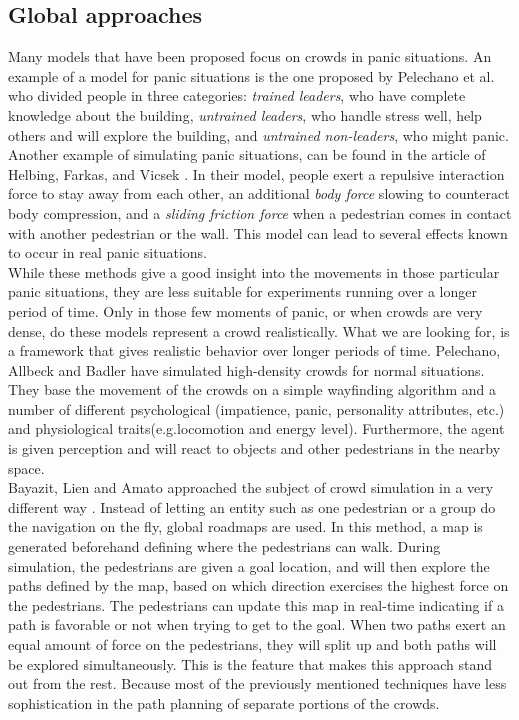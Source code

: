 \documentclass[11pt]{book}
\begin{document}
\subsection{Global approaches}
Many models that have been proposed focus on crowds in panic situations. An example of a model for panic situations is the one proposed by Pelechano et al. \cite{citeulike1080090} who divided people in three categories: \emph{trained leaders}, who have complete knowledge about the building, \emph{untrained leaders}, who handle stress well, help others and will explore the building, and \emph{untrained non-leaders}, who might panic.  Another example of simulating panic situations, can be found in the article of Helbing, Farkas, and Vicsek \cite{citeulike1656038}. In their model, people exert a repulsive interaction force to stay away from each other, an additional \emph{body force} slowing to counteract body compression, and a \emph{sliding friction force} when a pedestrian comes in contact with another pedestrian or the wall. This model can lead to several effects known to occur in real panic situations.\\
While these methods give a good insight into the movements in those particular panic situations, they are less suitable for experiments running over a longer period of time. Only in those few moments of panic, or when crowds are very dense, do these models represent a crowd realistically. What we are looking for, is a framework that gives realistic behavior over longer periods of time. Pelechano, Allbeck and Badler \cite{Pelechano:2007:CIA:1272690.1272705} have simulated high-density crowds for normal situations. They base the movement of the crowds on a simple wayfinding algorithm and a number of different psychological (impatience, panic, personality attributes, etc.) and physiological traits(e.g.locomotion and energy level). Furthermore, the agent is given perception and will react to objects and other pedestrians in the nearby space.\\
Bayazit, Lien and Amato approached the subject of crowd simulation in a very different way \cite{Bayazit02bettergroup}. Instead of letting an entity such as one pedestrian or a group do the navigation on the fly, global roadmaps are used. In this method, a map is generated beforehand defining where the pedestrians can walk. During simulation, the pedestrians are given a goal location, and will then explore the paths defined by the map, based on which direction exercises the highest force on the pedestrians. The pedestrians can update this map in real-time indicating if a path is favorable or not when trying to get to the goal. When two paths exert an equal amount of force on the pedestrians, they will split up and both paths will be explored simultaneously. This is the feature that makes this approach stand out from the rest. Because most of the previously mentioned techniques have less sophistication in the path planning of separate portions of the crowds. %
\end{document}
